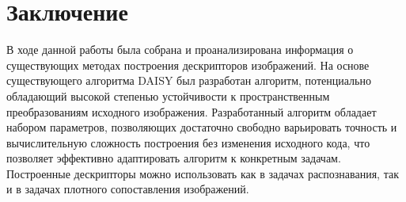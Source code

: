 {{{{\newpage
{}
{}
\section*{Заключение}
{
    В ходе данной работы была собрана и проанализирована информация о существующих методах построения дескрипторов изображений. На основе существующего алгоритма DAISY был разработан алгоритм, потенциально обладающий высокой степенью устойчивости к пространственным преобразованиям исходного изображения.
    Разработанный алгоритм обладает набором параметров, позволяющих достаточно свободно варьировать точность и вычислительную сложность построения без изменения исходного кода, что позволяет эффективно адаптировать алгоритм к конкретным задачам. 
    Построенные дескрипторы можно использовать как в задачах распознавания, так и в задачах плотного сопоставления изображений. 
}

\newpage
{}
{}
}}}}
